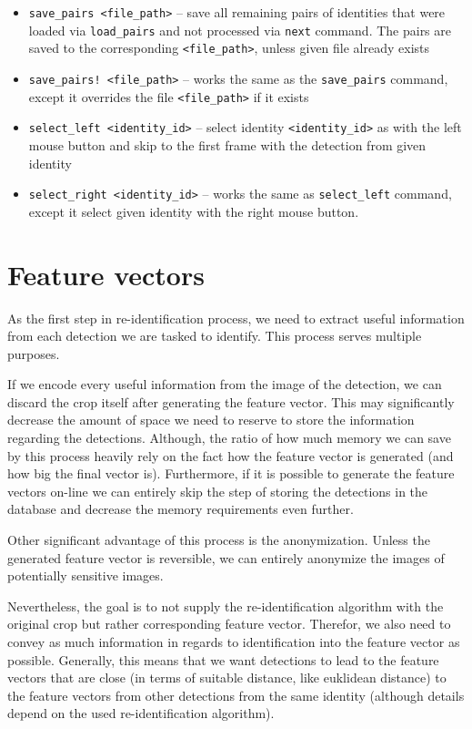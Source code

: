 \begin{itemize}
    \item \verb+save_pairs <file_path>+ -- save all remaining pairs of identities that were loaded via \verb+load_pairs+ and not processed via \verb+next+ command. The
    pairs are saved to the corresponding \verb+<file_path>+, unless given file already
    exists
    \item \verb+save_pairs! <file_path>+ -- works the same as the \verb+save_pairs+
    command, except it overrides the file \verb+<file_path>+ if it exists
    \item \verb+select_left <identity_id>+ -- select identity \verb+<identity_id>+ 
    as with the left mouse button and
    skip to the first frame with the detection from given identity
    \item \verb+select_right <identity_id>+ -- works the same as \verb+select_left+
    command, except it select given identity with the right mouse button.
\end{itemize}

\chapter{Feature vectors}

As the first step in re-identification process, we need to extract useful information
from each detection we are tasked to identify. This process serves multiple purposes.

If we encode every useful information from the image of the detection, we can discard
the crop itself after generating the feature vector. This may significantly decrease
the amount of space we need to reserve to store the information regarding the detections.
Although, the ratio of how much memory we can save by this process heavily rely on
the fact how the feature vector is generated (and how big the final vector is).
Furthermore, if it is possible to generate the feature vectors on-line we can entirely
skip the step of storing the detections in the database and decrease the memory
requirements even further.

Other significant advantage of this process is the anonymization. Unless the generated
feature vector is reversible, we can entirely anonymize the images of potentially
sensitive images.

Nevertheless, the goal is to not supply the re-identification algorithm with the original
crop but rather corresponding feature vector. Therefor, we also need to convey
as much information in regards to identification into the feature vector as possible.
Generally, this means that we want detections to lead to the feature vectors that are
close (in terms of suitable distance, like euklidean distance) to the feature vectors
from other detections from the same identity (although details depend on the 
used re-identification algorithm).

